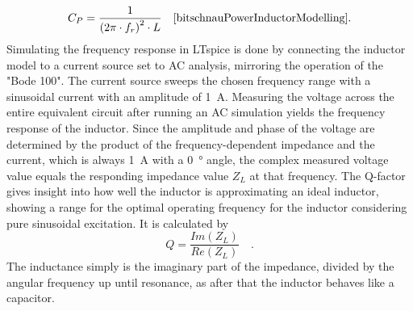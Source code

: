 \begin{equation}\label{eq:ecm_capacitance}
    C_P = \frac{1}{\left(2 \pi \cdot f_r\right)^2\cdot L} \quad\text{\cite{bitschnauPowerInductorModelling}.}
\end{equation}
Simulating the frequency response in LTspice is done by connecting the inductor model to a current source set to \ac{AC} analysis, mirroring the operation of the "Bode 100". The current source sweeps the chosen frequency range with a sinusoidal current with an amplitude of \SI{1}{A}. Measuring the voltage across the entire equivalent circuit after running an \ac{AC} simulation yields the frequency response of the inductor. Since the amplitude and phase of the voltage are determined by the product of the frequency-dependent impedance and the current, which is always \SI{1}{A} with a \SI{0}{\degree} angle, the complex measured voltage value equals the responding impedance value $Z_L$ at that frequency. The \ac{Q-factor} gives insight into how well the inductor is approximating an ideal inductor, showing a range for the optimal operating frequency for the inductor considering pure sinusoidal excitation. It is calculated by
\begin{equation}
    Q = \frac{Im(Z_L)}{Re(Z_L)} \quad\text{.} 
\end{equation}
The inductance simply is the imaginary part of the impedance, divided by the angular frequency up until resonance, as after that the inductor behaves like a capacitor. 
